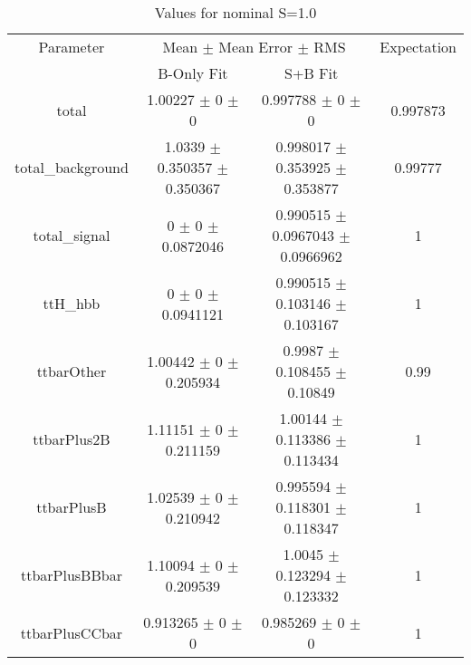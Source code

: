 \begin{table}
\centering
\caption{Values for nominal S=1.0}
\begin{tabular}{cccc}
\toprule
Parameter & \multicolumn{2}{c}{Mean $\pm$ Mean Error $\pm$ RMS} & Expectation\\
 & B-Only Fit & S+B Fit & \\
\midrule
total & \num{1.00227} $\pm$ \num{0} $\pm$ \num{0} & \num{0.997788} $\pm$ \num{0} $\pm$ \num{0} & \num{0.997873}\\
total\_background & \num{1.0339} $\pm$ \num{0.350357} $\pm$ \num{0.350367} & \num{0.998017} $\pm$ \num{0.353925} $\pm$ \num{0.353877} & \num{0.99777}\\
total\_signal & \num{0} $\pm$ \num{0} $\pm$ \num{0.0872046} & \num{0.990515} $\pm$ \num{0.0967043} $\pm$ \num{0.0966962} & \num{1}\\
ttH\_hbb & \num{0} $\pm$ \num{0} $\pm$ \num{0.0941121} & \num{0.990515} $\pm$ \num{0.103146} $\pm$ \num{0.103167} & \num{1}\\
ttbarOther & \num{1.00442} $\pm$ \num{0} $\pm$ \num{0.205934} & \num{0.9987} $\pm$ \num{0.108455} $\pm$ \num{0.10849} & \num{0.99}\\
ttbarPlus2B & \num{1.11151} $\pm$ \num{0} $\pm$ \num{0.211159} & \num{1.00144} $\pm$ \num{0.113386} $\pm$ \num{0.113434} & \num{1}\\
ttbarPlusB & \num{1.02539} $\pm$ \num{0} $\pm$ \num{0.210942} & \num{0.995594} $\pm$ \num{0.118301} $\pm$ \num{0.118347} & \num{1}\\
ttbarPlusBBbar & \num{1.10094} $\pm$ \num{0} $\pm$ \num{0.209539} & \num{1.0045} $\pm$ \num{0.123294} $\pm$ \num{0.123332} & \num{1}\\
ttbarPlusCCbar & \num{0.913265} $\pm$ \num{0} $\pm$ \num{0} & \num{0.985269} $\pm$ \num{0} $\pm$ \num{0} & \num{1}\\
\bottomrule
\end{tabular}
\end{table}